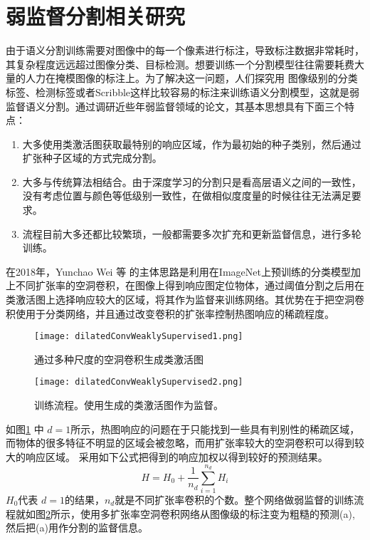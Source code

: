 \section{弱监督分割相关研究}

由于语义分割训练需要对图像中的每一个像素进行标注，导致标注数据非常耗时，其复杂程度远远超过图像分类、目标检测。想要训练一个分割模型往往需要耗费大量的人力在掩模图像的标注上。为了解决这一问题，人们探究用 图像级别的分类标签、检测标签或者Scribble这样比较容易的标注来训练语义分割模型，这就是弱监督语义分割。通过调研近些年弱监督领域的论文，其基本思想具有下面三个特点：
\begin{enumerate}
\item 大多使用类激活图获取最特别的响应区域，作为最初始的种子类别，然后通过扩张种子区域的方式完成分割。
\item 大多与传统算法相结合。由于深度学习的分割只是看高层语义之间的一致性，没有考虑位置与颜色等低级别一致性，在做相似度度量的时候往往无法满足要求。
\item 流程目前大多还都比较繁琐，一般都需要多次扩充和更新监督信息，进行多轮训练。
\end{enumerate}

在2018年，Yunchao Wei 等\cite{wei2018revisiting} 的主体思路是利用在ImageNet上预训练的分类模型加上不同扩张率的空洞卷积，在图像上得到响应图定位物体，通过阈值分割之后用在类激活图上选择响应较大的区域，将其作为监督来训练网络。其优势在于把空洞卷积使用于分类网络，并且通过改变卷积的扩张率控制热图响应的稀疏程度。

\begin{figure}[ht]
\begin{center}
\texttt{[image: dilatedConvWeaklySupervised1.png]}
\end{center}
\caption{通过多种尺度的空洞卷积生成类激活图\cite{wei2018revisiting}}
\label{fig:dilatedConvWeaklySupervised1}
\end{figure}

\begin{figure}[ht]
\begin{center}
\texttt{[image: dilatedConvWeaklySupervised2.png]}
\end{center}
\caption{训练流程\cite{wei2018revisiting}。使用生成的类激活图作为监督。}
\label{fig:dilatedConvWeaklySupervised2}
\end{figure}

如图\ref{fig:dilatedConvWeaklySupervised1} 中 $d = 1$所示，热图响应的问题在于只能找到一些具有判别性的稀疏区域，而物体的很多特征不明显的区域会被忽略，而用扩张率较大的空洞卷积可以得到较大的响应区域。 采用如下公式把得到的响应加权以得到较好的预测结果。
\begin{equation}
H=H_{0}+\frac{1}{n_{d}} \sum_{i=1}^{n_{d}} H_{i}
\end{equation}
$H_{0}$代表 $d = 1$的结果，$n_d$就是不同扩张率卷积的个数。整个网络做弱监督的训练流程就如图\ref{fig:dilatedConvWeaklySupervised2}所示，使用多扩张率空洞卷积网络从图像级的标注变为粗糙的预测(a),然后把(a)用作分割的监督信息。

